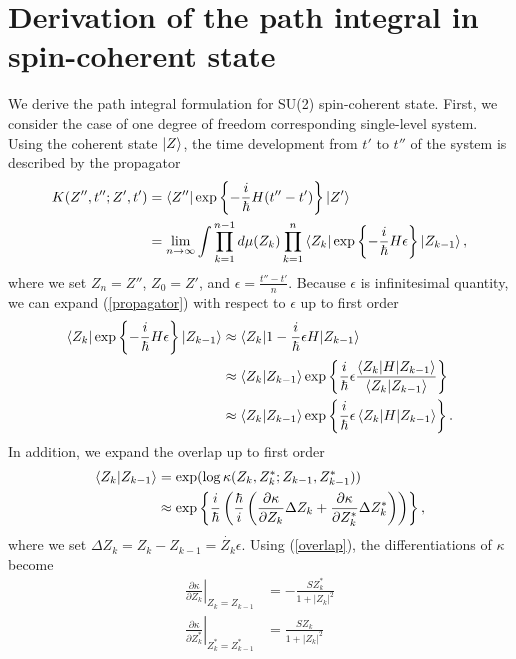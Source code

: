 \documentclass[11pt]{book} %
\begin{document}
\section{Derivation of the path integral in spin-coherent state}
We derive the path integral formulation for SU(2) spin-coherent state.
First, we consider the case of one degree of freedom corresponding single-level system.
Using the coherent state $\ket{Z}$, the time development from $t'$ to $t''$ of the system is described by the propagator
\begin{align}
  K(Z'',t'';Z',t') &= \braket{Z''|\exp \left\{-\frac{i}{\hbar}H(t''-t')\right\}|Z'} \\
  &= \lim_{n \to \infty} \int \prod_{k=1}^{n-1}d\mu(Z_k)\prod_{k=1}^{n}
  \braket{Z_k|\exp \left\{-\frac{i}{\hbar}H\epsilon\right\}|Z_{k-1}} ,
  \label{propagator}
\end{align}
where we set $Z_n=Z''$, $Z_0=Z'$, and $\epsilon=\frac{t''-t'}{n}$.
Because $\epsilon$ is infinitesimal quantity, we can expand (\ref{propagator}) with respect to $\epsilon$ up to first order
\begin{align}
  \braket{Z_k|\exp \left\{-\frac{i}{\hbar}H\epsilon\right\}|Z_{k-1}}
  &\approx \braket{Z_k|1-\frac{i}{\hbar}\epsilon H|Z_{k-1}} \nonumber \\
  &\approx \braket{Z_k|Z_{k-1}}\exp\left\{\frac{i}{\hbar}\epsilon
  \frac{\braket{Z_k|H|Z_{k-1}}}{\braket{Z_k|Z_{k-1}}}\right\} \nonumber \\
  &\approx \braket{Z_k|Z_{k-1}}\exp\left\{\frac{i}{\hbar}\epsilon
  \braket{Z_k|H|Z_{k-1}}\right\} .
\end{align}
In addition, we expand the overlap up to first order
\begin{align}
  \braket{Z_k|Z_{k-1}} &= \exp (\log \kappa(Z_k,Z_k^*;Z_{k-1},Z_{k-1}^*)) \nonumber \\
  &\approx \exp \left\{ \frac{i}{\hbar} \left(\frac{\hbar}{i} \left( 
  \frac{\partial \kappa}{\partial Z_k}\Delta Z_k + \frac{\partial \kappa}{\partial Z_k^*}\Delta Z_k^*
  \right) \right) \right\} ,
\end{align}
where we set $\Delta Z_k = Z_k - Z_{k-1} = \dot{Z_k}\epsilon$.
Using (\ref{overlap}), the differentiations of $\kappa$ become
\begin{align}
  \left. \frac{\partial \kappa}{\partial Z_k} \right|_{Z_k=Z_{k-1}} &= -\frac{SZ_k^*}{1+|Z_k|^2}\\
  \left. \frac{\partial \kappa}{\partial Z_k^*} \right|_{Z_k^*=Z_{k-1}^*} &= \frac{SZ_k}{1+|Z_k|^2}
\end{align}
\end{document}
